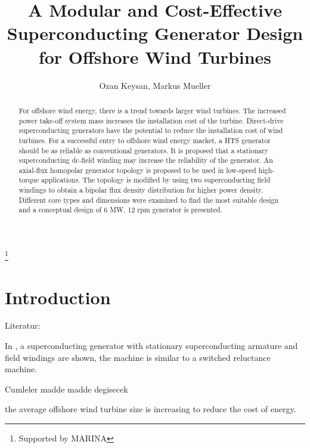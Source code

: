 \documentclass[12pt]{iopart}
\begin{document}
\title[]{A Modular and Cost-Effective Superconducting Generator Design for Offshore Wind Turbines}
\footnote{Supported by MARINA}
\author{Ozan Keysan, Markus Mueller}

\address{Institute for Energy Systems,
University of Edinburgh, 
EH93JL, UK}

\begin{abstract}
For offshore wind energy, there is a trend  towards larger wind turbines. The increased power take-off system mass increases the installation cost of the turbine. Direct-drive superconducting generators have the potential to reduce the installation cost of wind turbines. For a successful entry to offshore wind energy market, a HTS generator should be as reliable as conventional generators. It is proposed that a stationary superconducting dc-field winding may increase the reliability of the generator. An axial-flux homopolar generator topology is proposed to be used in low-speed high-torque applications. The topology is modified by using two superconducting field windings to obtain a bipolar flux density distribution for higher power density. Different core types and dimensions were examined to find the most suitable design and a conceptual design of 6 MW, 12 rpm generator is presented.
\end{abstract}

\maketitle

\section{Introduction}


Literatur:

In \cite{Chen2014}, a superconducting generator with stationary superconducting armature and field windings are shown, the machine is similar to a switched reluctance machine.

Cumleler madde madde degisecek

the average offshore wind turbine size is increasing to reduce the cost of energy.
\end{document}
